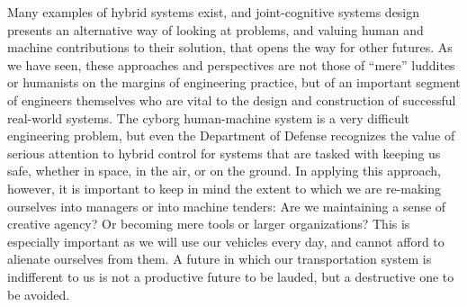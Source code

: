 Many examples of hybrid systems exist, and joint-cognitive systems
design presents an alternative way of looking at problems, and valuing
human and machine contributions to their solution, that opens the way
for other futures. As we have seen, these approaches and
perspectives are not those of ``mere'' luddites or humanists on the
margins of engineering practice, but of an important segment of
engineers themselves who are vital to the design and construction of
successful real-world systems. The cyborg human-machine system is a
very difficult engineering problem, but even the Department of Defense
recognizes the value of serious attention to hybrid control for 
systems that are tasked with keeping us safe, whether in space, in the
air, or on the ground. In applying this approach, however, it is
important to keep in mind the extent to which we are re-making
ourselves into managers or into machine tenders:  Are we maintaining a sense of
creative agency? Or becoming mere tools or larger organizations? This
is especially important as we will use our  
vehicles every day, and cannot afford to alienate ourselves from them.
A future in which our transportation system is indifferent to us is
not a productive future to be lauded, but a destructive one to be
avoided. 


